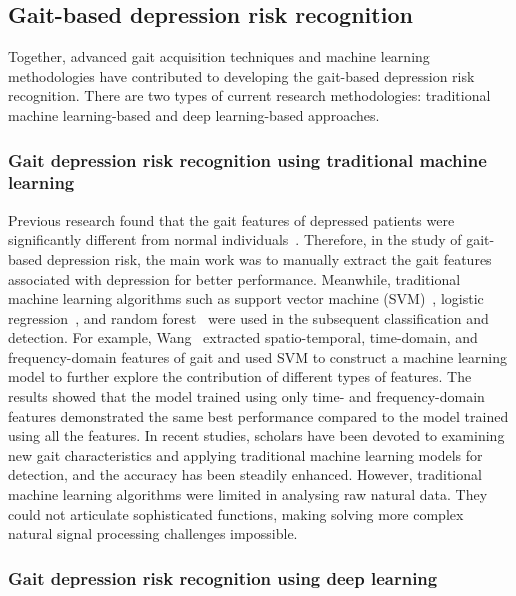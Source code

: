 \documentclass[10pt,twocolumn,letterpaper]{article}
\begin{document}
\subsection{Gait-based depression risk recognition}

Together, advanced gait acquisition techniques and machine learning methodologies have contributed to developing the gait-based depression risk recognition.
There are two types of current research methodologies: traditional machine learning-based and deep learning-based approaches.

\subsubsection{Gait depression risk recognition using traditional machine learning}
Previous research found that the gait features of depressed patients were significantly different from normal individuals~\cite{sloman1982gait,lemke2000spatiotemporal}. Therefore, in the study of gait-based depression risk, the main work was to manually extract the gait features associated with depression for better performance. Meanwhile, traditional machine learning algorithms such as support vector machine (SVM)~\cite{wang2021detecting,li2021simple,fang2019depression,lu2022postgraduate,yuan2018depression}, logistic regression~\cite{li2021simple,fang2019depression}, and random forest~\cite{wang2021detecting,fang2019depression,lu2022postgraduate} were used in the subsequent classification and detection.
For example, Wang~\cite{wang2021detecting} extracted spatio-temporal, time-domain, and frequency-domain features of gait and used SVM to construct a machine learning model to further explore the contribution of different types of features.
The results showed that the model trained using only time- and frequency-domain features demonstrated the same best performance compared to the model trained using all the features.
In recent studies, scholars have been devoted to examining new gait characteristics and applying traditional machine learning models for detection, and the accuracy has been steadily enhanced.
However, traditional machine learning algorithms were limited in analysing raw natural data. They could not articulate sophisticated functions, making solving more complex natural signal processing challenges impossible.




\subsubsection{Gait depression risk recognition using deep learning}
\end{document}
